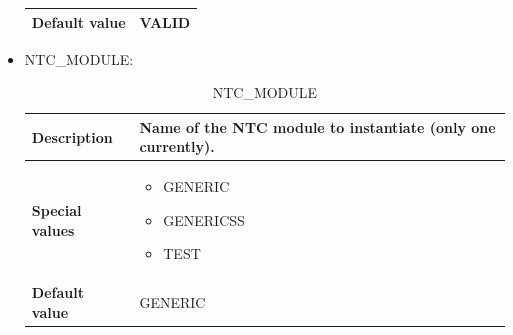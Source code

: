 \begin{itemize}
\begin{longtable}{|l|l|}
				\hline

					\begin{minipage}[t]{0.22\linewidth} \textbf{Default value}	\end{minipage}
				&	\begin{minipage}[t]{0.78\linewidth} VALID \end{minipage} \\

				\hline

			\end{longtable}

		\item NTC\_MODULE:

			\begin{longtable}{|l|l|}
				\caption{NTC\_MODULE}\\
				\hline

					\begin{minipage}[t]{0.22\linewidth} \textbf{Description} \end{minipage}
				&	\begin{minipage}[t]{0.78\linewidth} Name of the NTC module to instantiate (only one currently). \end{minipage} \\

				\hline

					\begin{minipage}[t]{0.22\linewidth} \textbf{Special values}	\end{minipage}
				&	\begin{minipage}[t]{0.78\linewidth} \begin{itemize} \item GENERIC \item GENERICSS \item TEST \end{itemize} \end{minipage} \\

				\hline

					\begin{minipage}[t]{0.22\linewidth} \textbf{Default value}	\end{minipage}
				&	\begin{minipage}[t]{0.78\linewidth} GENERIC \end{minipage} \\

				\hline

			\end{longtable}


\end{itemize}
